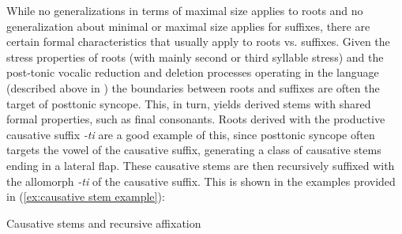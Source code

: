 While no generalizations in terms of maximal size applies to roots and no generalization about minimal or maximal size applies for suffixes, there are certain formal characteristics that usually apply to roots vs. suffixes. Given the stress properties of roots (with mainly second or third syllable stress) and the post-tonic vocalic reduction and deletion processes operating in the language (described above in ) the boundaries between roots and suffixes are often the target of posttonic syncope. This, in turn, yields derived stems with shared formal properties, such as final consonants. Roots derived with the productive causative suffix \textit{-ti} are a good example of this, since posttonic syncope often targets the vowel of the causative suffix, generating a class of causative stems ending in a lateral flap.  These causative stems are then recursively suffixed with the allomorph \textit{-ti} of the causative suffix. This is shown in the examples provided in (\ref{ex:causative stem example}):


\ea\label{ex:causative stem example}
{Causative stems and recursive affixation}
    	\z
	\z

